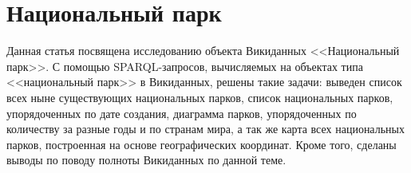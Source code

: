 \chapter{Национальный парк}
\label{ch:national-park}
Данная статья посвящена исследованию объекта Викиданных <<Национальный парк>>. С помощью SPARQL-запросов, вычисляемых на объектах типа <<национальный парк>> в Викиданных, решены такие задачи: выведен список всех ныне существующих национальных парков, список национальных парков, упорядоченных по дате создания, диаграмма парков, упорядоченных по количеству за разные годы и по странам мира, а так же карта всех национальных парков, построенная на основе географических координат. Кроме того, сделаны выводы по поводу полноты Викиданных по данной теме.

